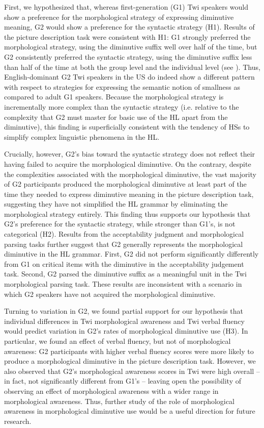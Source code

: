 \documentclass[output=paper,colorlinks,citecolor=brown]{langscibook}
\begin{document}
First, we hypothesized that, whereas first-generation (G1) Twi speakers would show a preference for the morphological strategy of expressing diminutive meaning, G2 would show a preference for the syntactic strategy (H1). Results of the picture description task were consistent with H1: G1 strongly preferred the morphological strategy, using the diminutive suffix well over half of the time, but G2 consistently preferred the syntactic strategy, using the diminutive suffix less than half of the time at both the group level and the individual level (see ). Thus, English-dominant G2 Twi speakers in the US do indeed show a different pattern with respect to strategies for expressing the semantic notion of smallness as compared to adult G1 speakers. Because the morphological strategy is incrementally more complex than the syntactic strategy (i.e. relative to the complexity that G2 must master for basic use of the HL apart from the diminutive), this finding is superficially consistent with the tendency of HSs to simplify complex linguistic phenomena in the HL. 

Crucially, however, G2's bias toward the syntactic strategy does not reflect their having failed to acquire the morphological diminutive. On the contrary, despite the complexities associated with the morphological diminutive, the vast majority of G2 participants produced the morphological diminutive at least part of the time they needed to express diminutive meaning in the picture description task, suggesting they have not simplified the HL grammar by eliminating the morphological strategy entirely. This finding thus supports our hypothesis that G2's preference for the syntactic strategy, while stronger than G1's, is not categorical (H2). Results from the acceptability judgment and morphological parsing tasks further suggest that G2 generally represents the morphological diminutive in the HL grammar. First, G2 did not perform significantly differently from G1 on critical items with the diminutive in the acceptability judgement task. Second, G2 parsed the diminutive suffix as a meaningful unit in the Twi morphological parsing task. These results are inconsistent with a scenario in which G2 speakers have not acquired the morphological diminutive.

Turning to variation in G2, we found partial support for our hypothesis that individual differences in Twi morphological awareness and Twi verbal fluency would predict variation in G2's rates of morphological diminutive use (H3). In particular, we found an effect of verbal fluency, but not of morphological awareness: G2 participants with higher verbal fluency scores were more likely to produce a morphological diminutive in the picture description task. However, we also observed that G2's morphological awareness scores in Twi were high overall -- in fact, not significantly different from G1's -- leaving open the possibility of observing an effect of morphological awareness with a wider range in morphological awareness. Thus, further study of the role of morphological awareness in morphological diminutive use would be a useful direction for future research.
\end{document}
